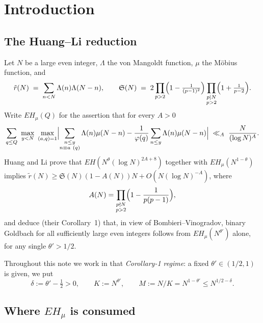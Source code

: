 \documentclass[11pt,a4paper]{article}
\theoremstyle{plain}
\theoremstyle{definition}
\renewcommand{\SS}{\mathfrak{S}}
\begin{document}
\section{Introduction}

\subsection{The Huang--Li reduction}

Let $N$ be a large even integer, $\Lambda$ the von Mangoldt function,
$\mu$ the M\"obius function, and
\[
  \tilde r(N) \;=\; \sum_{n<N} \Lambda(n)\Lambda(N-n),
  \qquad
  \SS(N) \;=\; 2\prod_{p>2}\Bigl(1-\tfrac{1}{(p-1)^2}\Bigr)
                \prod_{\substack{p\mid N\\ p>2}}\Bigl(1+\tfrac{1}{p-2}\Bigr).
\]
Write $EH_\mu(Q)$ for the assertion that for every $A>0$
\begin{equation}\label{eq:EHmu}
  \sum_{q\le Q}\ \max_{y<N}\ \max_{(a,q)=1}
  \Bigl|\sum_{\substack{n\le y\\ n\equiv a\ (q)}}\Lambda(n)\mu(N-n)
        -\frac{1}{\varphi(q)}\sum_{n\le y}\Lambda(n)\mu(N-n)\Bigr|
  \;\ll_A\; \frac{N}{(\log N)^A}.
\end{equation}
Huang and Li \cite{HL} prove that $EH(N^\theta(\log N)^{2A+8})$ together
with $EH_\mu(N^{1-\theta})$ implies
$\tilde r(N)\ge \SS(N)(1-A(N))N + O(N(\log N)^{-A})$, where
\begin{equation}\label{eq:AN}
  A(N)=\prod_{\substack{p\nmid N\\ p>2}}\Bigl(1-\frac{1}{p(p-1)}\Bigr),
\end{equation}
and deduce (their Corollary~1) that, in view of Bombieri--Vinogradov,
binary Goldbach for all sufficiently large even integers follows from
$EH_\mu(N^{\theta'})$ alone, for any single $\theta'>1/2$.

Throughout this note we work in that \emph{Corollary-1 regime}: a fixed
$\theta'\in(1/2,1)$ is given, we put
\[
  \delta := \theta' - \tfrac12 > 0, \qquad K := N^{\theta'},
  \qquad M := N/K = N^{1-\theta'} \le N^{1/2-\delta}.
\]

\subsection{Where $EH_\mu$ is consumed}
\end{document}
